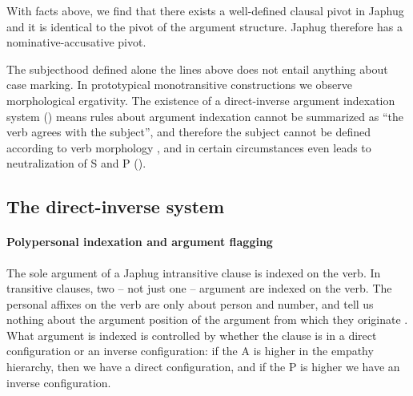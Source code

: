 \documentclass[a4paper, oneside, 12pt]{report}
\newcommand*{\citepage}[1]{p.~{#1}}
\begin{document}
With facts above, we find that there exists a well-defined clausal pivot in Japhug
and it is identical to the pivot of the argument structure.
Japhug therefore has a nominative-accusative pivot.

The subjecthood defined alone the lines above does not entail
anything about case marking.
In prototypical monotransitive constructions
we observe morphological ergativity.
The existence of a direct-inverse argument indexation system ()
means rules about argument indexation cannot be summarized as 
``the verb agrees with the subject'',
and therefore the subject cannot be defined according to verb morphology \citep{jacques2016subjects},
and in certain circumstances even leads to neutralization of S and P
().

\subsection{The direct-inverse system}\label{sec:grammatical.clause.direct-inverse}

\paragraph*{Polypersonal indexation and argument flagging}
The sole argument of a Japhug intransitive clause is indexed on the verb.
In transitive clauses, 
two -- not just one -- argument are indexed on the verb. 
The personal affixes on the verb are only about person and number, 
and tell us nothing about the argument position of the argument 
from which they originate \citep[\citepage{543}]{jacques2021grammar}.
What argument is indexed is controlled by whether the clause is in a direct configuration
or an inverse configuration:
if the A is higher in the empathy hierarchy,
then we have a direct configuration,
and if the P is higher we have an inverse configuration.
\end{document}
